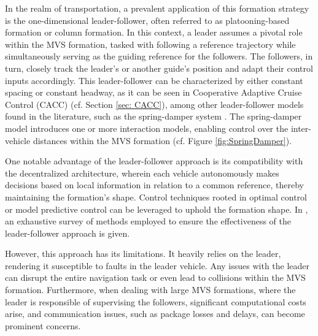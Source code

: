 In the realm of transportation, a prevalent application of this formation strategy is the one-dimensional leader-follower, often referred to as platooning-based formation or column formation. In this context, a leader assumes a pivotal role within the MVS formation, tasked with following a reference trajectory while simultaneously serving as the guiding reference for the followers. The followers, in turn, closely track the leader's or another guide's position and adapt their control inputs accordingly. This leader-follower can be characterized by either constant spacing or constant headway, as it can be seen in Cooperative Adaptive Cruise Control (CACC) (cf. Section \ref{sec: CACC}), among other leader-follower models found in the literature, such as the spring-damper system \cite{hutchison_bending_2009}. The spring-damper model introduces one or more interaction models, enabling control over the inter-vehicle distances within the MVS formation (cf. Figure \ref{fig:SpringDamper}). 

One notable advantage of the leader-follower approach is its compatibility with the decentralized architecture, wherein each vehicle autonomously makes decisions based on local information in relation to a common reference, thereby maintaining the formation's shape. Control techniques rooted in optimal control or model predictive control can be leveraged to uphold the formation shape. In \cite{7225700}, an exhaustive survey of methods employed to ensure the effectiveness of the leader-follower approach is given. 

However, this approach has its limitations. It heavily relies on the leader, rendering it susceptible to faults in the leader vehicle. Any issues with the leader can disrupt the entire navigation task or even lead to collisions within the MVS formation. Furthermore, when dealing with large MVS formations, where the leader is responsible of supervising the followers, significant computational costs arise, and communication issues, such as package losses and delays, can become prominent concerns. 








